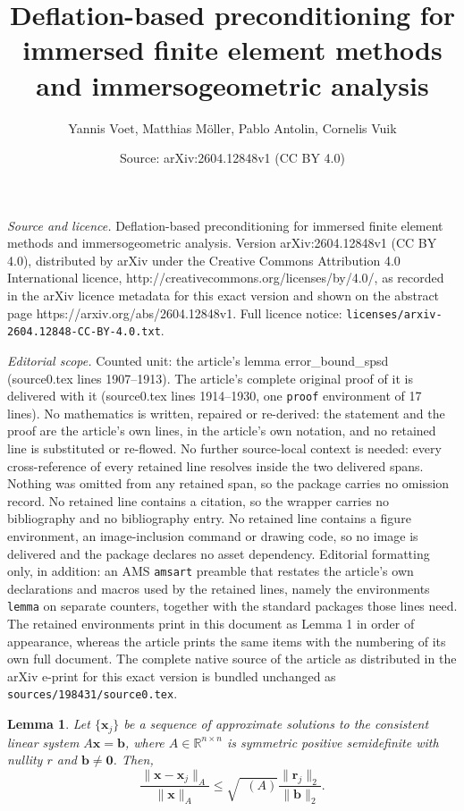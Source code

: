 \documentclass[10pt,a4paper]{amsart}
\title{Deflation-based preconditioning for immersed finite element methods and immersogeometric analysis}
\author{Yannis Voet, Matthias M\"oller, Pablo Antolin, Cornelis Vuik}
\date{Source: arXiv:2604.12848v1 (CC BY 4.0)}
\newtheorem{lemma}{Lemma}
\DeclareMathOperator{\keff}{\kappa_{\operatorname{eff}}}
\begin{document}
\maketitle

\noindent\emph{Source and licence.} Deflation-based preconditioning for immersed finite element methods and immersogeometric analysis. Version arXiv:2604.12848v1 (CC BY 4.0), distributed by arXiv under the Creative Commons Attribution 4.0 International licence, http://creativecommons.org/licenses/by/4.0/, as recorded in the arXiv licence metadata for this exact version and shown on the abstract page https://arxiv.org/abs/2604.12848v1. Full licence notice: \texttt{licenses/arxiv-2604.12848-CC-BY-4.0.txt}.\par\smallskip

\noindent\textit{Editorial scope.} Counted unit: the article's lemma error\_bound\_spsd (source0.tex lines 1907--1913). The article's complete original proof of it is delivered with it (source0.tex lines 1914--1930, one \texttt{proof} environment of 17 lines). No mathematics is written, repaired or re-derived: the statement and the proof are the article's own lines, in the article's own notation, and no retained line is substituted or re-flowed.  No further source-local context is needed: every cross-reference of every retained line resolves inside the two delivered spans.  Nothing was omitted from any retained span, so the package carries no omission record.  No retained line contains a citation, so the wrapper carries no bibliography and no bibliography entry.  No retained line contains a figure environment, an image-inclusion command or drawing code, so no image is delivered and the package declares no asset dependency.  Editorial formatting only, in addition: an AMS \texttt{amsart} preamble that restates the article's own declarations and macros used by the retained lines, namely the environments \texttt{lemma} on separate counters, together with the standard packages those lines need.  The retained environments print in this document as Lemma 1 in order of appearance, whereas the article prints the same items with the numbering of its own full document.  The complete native source of the article as distributed in the arXiv e-print for this exact version is bundled unchanged as \texttt{sources/198431/source0.tex}.
\begin{lemma}
\label{lem: error_bound_spsd}
Let $\{\bm{x}_j\}$ be a sequence of approximate solutions to the consistent linear system $A\bm{x}=\bm{b}$, where $A \in \mathbb{R}^{n \times n}$ is symmetric positive semidefinite with nullity $r$ and $\bm{b} \neq \bm{0}$. Then,
\begin{equation*}
    \frac{\|\bm{x}-\bm{x}_j\|_A}{\|\bm{x}\|_A} \leq \sqrt{\keff(A)} \frac{\|\bm{r}_j\|_2}{\|\bm{b}\|_2}.
\end{equation*}
\end{lemma}
\end{document}
